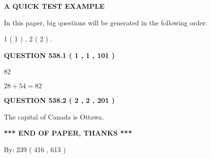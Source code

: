 \documentclass[12pt]{article}
\begin{document}
   
\vspace{0.2in}
   
   
   
   
   
   
 \vspace{0.2in}
{\LARGE {\textbf{ A QUICK TEST EXAMPLE}}}
   
   
   
\vspace{0.2in}
   
In this paper, big questions will be generated in the following order: 
   
   
   1 ( 1 )
 ,
   2 ( 2 )
 .
  
\vspace{0.2in}
  
{\textbf{\Large{QUESTION
538.1 
 ( 1 , 1 , 101 )
}}}
  
  
 
 
\noindent{}

82
 
 
 
 
\noindent{}

$ %
28 +  %
54=   %
82$
 
 
  
\vspace{0.2in}
  
{\textbf{\Large{QUESTION
538.2 
 ( 2 , 2 , 201 )
}}}
  
  
 
 
\noindent{}
 
 
The capital of Canada is Ottawa.
 
 
 
 
   
   
 \vspace{0.2in}
 
   
   
   
   
\vspace{1.0in} 
{\textbf{\large{ *** END OF PAPER, THANKS *** }}} 
   
   
\hspace{1.0in} By: 
 239 ( 416 ,  613 )
   
   
   
\end{document}
